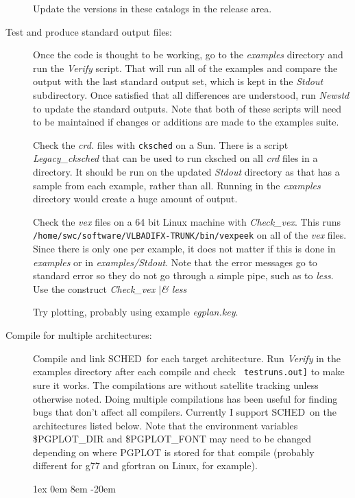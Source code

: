 \documentclass{report}
\newcommand{\schedb}{{\sc SCHED~}}
\begin{document}
\begin{description}
Update the versions in these catalogs in the release area.



\item [Test and produce standard output files:]

Once the code is thought to be working, go to the {\sl examples} directory
and run the {\sl Verify} script.  That will run all of the examples and 
compare the output with the last standard output set, which is kept in the
{\sl Stdout} subdirectory.  Once satisfied that all differences are 
understood, run {\sl Newstd} to update the standard outputs.  Note that 
both of these scripts will need to be maintained if changes or additions
are made to the examples suite.

Check the {\sl crd.} files with {\tt cksched} on a Sun.  There is a 
script {\sl Legacy\_cksched} that can be used to run cksched on all
{\sl crd} files in a directory.  It should be run on the updated
{\sl Stdout} directory as that has a sample from each example, rather 
than all.  Running in the {\sl examples} directory would create a 
huge amount of output.

Check the {\sl vex} files on a 64 bit Linux machine with {\sl
Check\_vex}.  This runs {\tt
/home/swc/software/VLBADIFX-TRUNK/bin/vexpeek} on all of the {\sl vex}
files.  Since there is only one per example, it does not matter if
this is done in {\sl examples} or in {\sl examples/Stdout}.  Note that
the error messages go to standard error so they do not go through a
simple pipe, such as to {\sl less}.  Use the construct {\sl Check\_vex
$|$\& less}

Try plotting, probably using example {\sl egplan.key}.


\item [Compile for multiple architectures:]

Compile and link \schedb for each target architecture.  Run {\sl
Verify} in the examples directory after each compile and check {\tt
testruns.out]} to make sure it works.  The compilations are without
satellite tracking unless otherwise noted.  Doing multiple
compilations has been useful for finding bugs that don't affect all
compilers.  Currently I support \schedb on the architectures listed
below.  Note that the environment variables \$PGPLOT\_DIR and \$PGPLOT\_FONT
may need to be changed depending on where PGPLOT is stored for that
compile (probably different for g77 and gfortran on Linux, for
example).

\begin{list}{}{\parsep 1ex  \itemsep 0em
                 \leftmargin 8em  \itemindent -20em }


\end{list}
\end{description}
\end{document}
